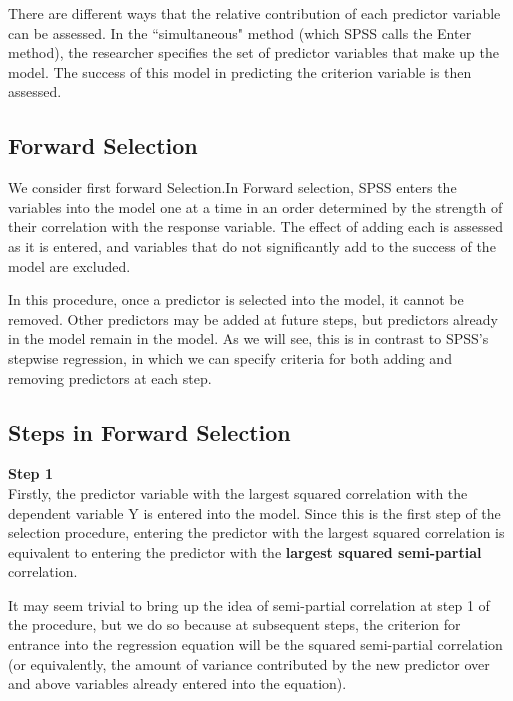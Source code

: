 \documentclass[a4paper,12pt]{article}
\begin{document}
There are different ways that the relative contribution of each predictor variable can be assessed. In the ``simultaneous" method (which SPSS calls the Enter method), the researcher specifies the set of predictor variables that make up the model. The success of this model in predicting the criterion variable is then assessed.


\subsection{Forward Selection}
We consider first forward Selection.In Forward selection, SPSS enters the variables into the model one at a time in an
order determined by the strength of their correlation with the response variable. The effect of adding each is assessed as it is entered, and variables that do not significantly add to the success of the model are excluded.

In this procedure, once a predictor is selected into the model, it cannot be removed. Other predictors may be added at future steps, but predictors already in the model remain in the model. As we will see, this is in contrast to SPSS's stepwise regression, in which we can specify criteria for both adding and removing predictors at each step.

\subsection{Steps in Forward Selection}
\textbf{Step 1}\\
Firstly, the predictor variable with the largest squared correlation with the dependent variable Y is entered into the model. Since this is the first step of the selection procedure, entering the predictor with the largest squared correlation is equivalent to entering the predictor with the \textbf{largest squared semi-partial} correlation. 

It may seem trivial to bring up the idea of semi-partial correlation at step 1 of the procedure, but we do so because at subsequent steps, the criterion for entrance into the regression equation will be the squared semi-partial correlation (or equivalently, the amount of variance contributed by the new predictor over and above variables already entered into the equation).
\end{document}
